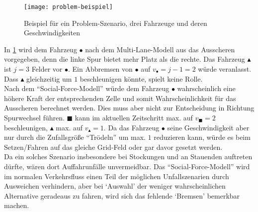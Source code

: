 \begin{figure}[hptb]
 \centering
 \texttt{[image: problem-beispiel]}
 \caption[Problem-Beispiel]{Beispiel für ein Problem-Szenario, drei Fahrzeuge und deren Geschwindigkeiten}
 \label{figure:problem-beispiel}
\end{figure}

In \cref{figure:problem-beispiel} wird dem Fahrzeug $\bullet$ nach dem Multi-Lane-Modell aus \cite{multi-lane} das Ausscheren vorgegeben, denn die linke Spur bietet mehr Platz als die rechte. 
Das Fahrzeug $\blacktriangle$ ist $j=3$ Felder vor $\bullet$.
Ein Abbremsen von $\bullet$ auf $v_{\bullet}=j-1=2$ würde veranlasst.
Dass $\blacktriangle$ gleichzeitig um $1$ beschleunigen könnte, spielt keine Rolle. \\
Nach dem \enquote{Social-Force-Modell} würde dem Fahrzeug $\bullet$ wahrscheinlich eine höhere Kraft der entsprechenden Zelle und somit Wahrscheinlichkeit für das Ausscheren berechnet werden.
Dies muss aber nicht zur Entscheidung in Richtung Spurwechsel führen.
$\blacksquare$ kann im aktuellen Zeitschritt max. auf $v_{\blacksquare}=2$ beschleunigen, $\blacktriangle$ max. auf $v_{\blacktriangle}=1$.
Da das Fahrzeug $\bullet$ seine Geschwindigkeit aber nur durch die Zufallsgröße \enquote{Trödeln} um max. $1$ reduzieren kann, würde es beim Setzen/Fahren auf das gleiche Grid-Feld oder gar davor gesetzt werden. \\
Da ein solches Szenario insbesondere bei Stockungen und an Stauenden auftreten dürfte, wären dort Auffahrunfälle unvermeidbar. 
Das \enquote{Social-Force-Modell} wird im normalen Verkehrsfluss einen Teil der möglichen Unfallszenarien durch Ausweichen verhindern, aber bei \enquote*{Auswahl} der weniger wahrscheinlichen Alternative geradeaus zu fahren, wird sich das fehlende \enquote*{Bremsen} bemerkbar machen.
